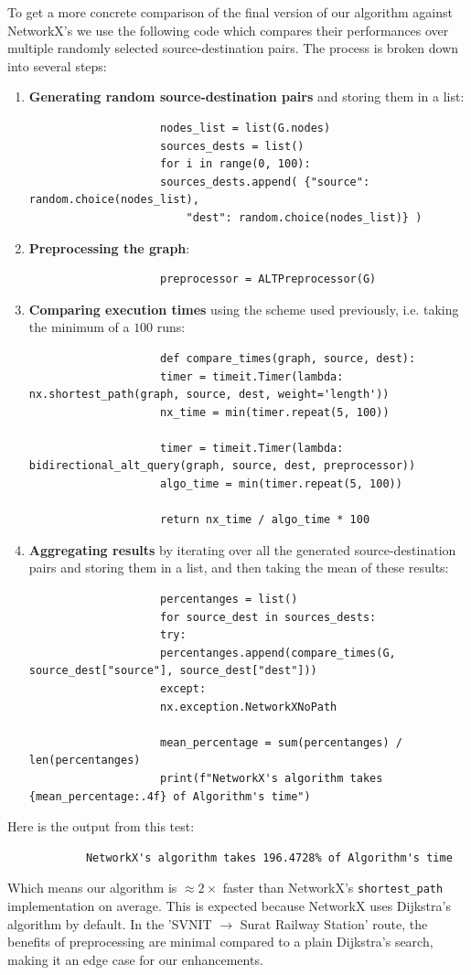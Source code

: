 	 	To get a more concrete comparison of the final version of our algorithm against NetworkX's we use the following code which compares their performances over multiple randomly selected source-destination pairs. The process is broken down into several steps:
	 		
	 		\begin{enumerate}
	 			\item \textbf{Generating random source-destination pairs} and storing them in a list:
	 			\begin{lstlisting}
	 				nodes_list = list(G.nodes)
	 				sources_dests = list()
	 				for i in range(0, 100):
	 				sources_dests.append( {"source": random.choice(nodes_list),
	 					"dest": random.choice(nodes_list)} )
	 			\end{lstlisting}
	 			
	 			\item \textbf{Preprocessing the graph}:
	 			\begin{lstlisting}
	 				preprocessor = ALTPreprocessor(G)
	 			\end{lstlisting}

	 			\item \textbf{Comparing execution times} using the scheme used previously, i.e. taking the minimum of a $100$ runs:
	 			\begin{lstlisting}
	 				def compare_times(graph, source, dest):
	 				timer = timeit.Timer(lambda: nx.shortest_path(graph, source, dest, weight='length'))
	 				nx_time = min(timer.repeat(5, 100))
	 				
	 				timer = timeit.Timer(lambda: bidirectional_alt_query(graph, source, dest, preprocessor))
	 				algo_time = min(timer.repeat(5, 100))
	 				
	 				return nx_time / algo_time * 100
	 			\end{lstlisting}
	 			
	 			\item \textbf{Aggregating results} by iterating over all the generated source-destination pairs and storing them in a list, and then taking the mean of these results:
	 			\begin{lstlisting}
	 				percentanges = list()
	 				for source_dest in sources_dests:
	 				try:
	 				percentanges.append(compare_times(G, source_dest["source"], source_dest["dest"]))
	 				except:
	 				nx.exception.NetworkXNoPath
	 				
	 				mean_percentage = sum(percentanges) / len(percentanges)
	 				print(f"NetworkX's algorithm takes {mean_percentage:.4f} of Algorithm's time")
	 			\end{lstlisting}
	 		\end{enumerate}
	 	Here is the output from this test:
	 	\begin{verbatim}
	 		NetworkX's algorithm takes 196.4728% of Algorithm's time
	 	\end{verbatim}
	 	Which means our algorithm is $\approx 2\times$ faster than NetworkX's \texttt{shortest\_path} implementation on average. This is expected because NetworkX uses Dijkstra's algorithm by default. In the 'SVNIT $\to$ Surat Railway Station' route, the benefits of preprocessing are minimal compared to a plain Dijkstra's search, making it an edge case for our enhancements.
	 